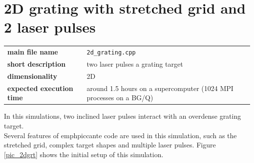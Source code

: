 \documentclass[11pt,a4paper]{report}
\begin{document}
\section{2D grating with stretched grid and 2 laser pulses}
\begin{center}
    \begin{tabular}{ l | l }
    	\textbf{main file name} & \verb+2d_grating.cpp+\\
    	\textbf{short description} & two laser pulses  a grating target \\
    	\textbf{dimensionality} & 2D  \\
    	\textbf{expected execution time} & around 1.5 hours on a supercomputer (1024 MPI processes on a BG/Q)
    \end{tabular}
    \end{center}
In this simulations, two inclined laser pulses interact with an overdense grating target. \\
Several features of emph{piccante} code are used in this simulation, such as the stretched grid, complex target shapes and multiple laser pulses. Figure \ref{pic_2dgrt} shows the initial setup of this simulation.
\end{document}

